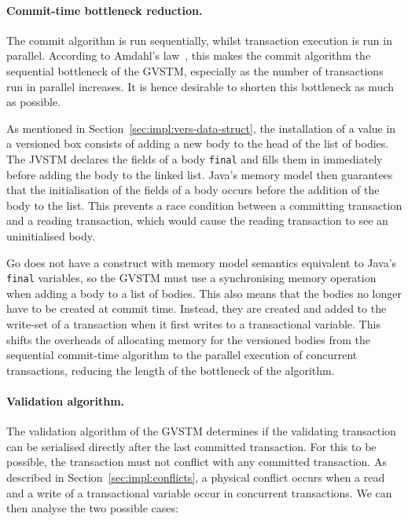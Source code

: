 \documentclass[12pt,a4paper,oneside,openright]{report}
\newcommand{\javaKeyword}[1]{\texttt{#1}}
\begin{document}
\paragraph{Commit-time bottleneck reduction.} The commit algorithm is
run sequentially, whilst transaction execution is run in
parallel. According to Amdahl's law~\cite{Amdahl}, this makes the
commit algorithm the sequential bottleneck of the GVSTM, especially as
the number of transactions run in parallel increases. It is hence
desirable to shorten this bottleneck as much as possible.

As mentioned in Section~\ref{sec:impl:vers-data-struct}, the
installation of a value in a versioned box consists of adding a new
body to the head of the list of bodies. The JVSTM declares the fields
of a body \javaKeyword{final} and fills them in immediately before
adding the body to the linked list. Java's memory model then
guarantees that the initialisation of the fields of a body occurs
before the addition of the body to the list. This prevents a race
condition between a committing transaction and a reading transaction,
which would cause the reading transaction to see an uninitialised
body.

Go does not have a construct with memory model semantics equivalent to
Java's \javaKeyword{final} variables, so the GVSTM must use a
synchronising memory operation when adding a body to a list of
bodies. This also means that the bodies no longer have to be created
at commit time. Instead, they are created and added to the write-set
of a transaction when it first writes to a transactional
variable. This shifts the overheads of allocating memory for the
versioned bodies from the sequential commit-time algorithm to the
parallel execution of concurrent transactions, reducing the length of
the bottleneck of the algorithm.

\paragraph{Validation algorithm.} The validation algorithm of the
GVSTM determines if the validating transaction can be serialised
directly after the last committed transaction. For this to be
possible, the transaction must not conflict with any committed
transaction. As described in Section~\ref{sec:impl:conflicts}, a
physical conflict occurs when a read and a write of a transactional
variable occur in concurrent transactions. We can then analyse the two
possible cases:
\end{document}
